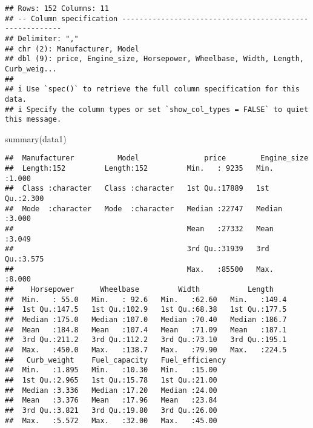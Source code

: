 \documentclass[
]{article}
\newenvironment{Shaded}{\begin{snugshade}}{\end{snugshade}}
\newcommand{\FunctionTok}[1]{\textcolor[rgb]{0.00,0.00,0.00}{#1}}
\newcommand{\NormalTok}[1]{#1}
\begin{document}
\begin{verbatim}
## Rows: 152 Columns: 11
## -- Column specification --------------------------------------------------------
## Delimiter: ","
## chr (2): Manufacturer, Model
## dbl (9): price, Engine_size, Horsepower, Wheelbase, Width, Length, Curb_weig...
## 
## i Use `spec()` to retrieve the full column specification for this data.
## i Specify the column types or set `show_col_types = FALSE` to quiet this message.
\end{verbatim}

\begin{Shaded}
\begin{Highlighting}[]
\FunctionTok{summary}\NormalTok{(data1)}
\end{Highlighting}
\end{Shaded}

\begin{verbatim}
##  Manufacturer          Model               price        Engine_size   
##  Length:152         Length:152         Min.   : 9235   Min.   :1.000  
##  Class :character   Class :character   1st Qu.:17889   1st Qu.:2.300  
##  Mode  :character   Mode  :character   Median :22747   Median :3.000  
##                                        Mean   :27332   Mean   :3.049  
##                                        3rd Qu.:31939   3rd Qu.:3.575  
##                                        Max.   :85500   Max.   :8.000  
##    Horsepower      Wheelbase         Width           Length     
##  Min.   : 55.0   Min.   : 92.6   Min.   :62.60   Min.   :149.4  
##  1st Qu.:147.5   1st Qu.:102.9   1st Qu.:68.38   1st Qu.:177.5  
##  Median :175.0   Median :107.0   Median :70.40   Median :186.7  
##  Mean   :184.8   Mean   :107.4   Mean   :71.09   Mean   :187.1  
##  3rd Qu.:211.2   3rd Qu.:112.2   3rd Qu.:73.10   3rd Qu.:195.1  
##  Max.   :450.0   Max.   :138.7   Max.   :79.90   Max.   :224.5  
##   Curb_weight    Fuel_capacity   Fuel_efficiency
##  Min.   :1.895   Min.   :10.30   Min.   :15.00  
##  1st Qu.:2.965   1st Qu.:15.78   1st Qu.:21.00  
##  Median :3.336   Median :17.20   Median :24.00  
##  Mean   :3.376   Mean   :17.96   Mean   :23.84  
##  3rd Qu.:3.821   3rd Qu.:19.80   3rd Qu.:26.00  
##  Max.   :5.572   Max.   :32.00   Max.   :45.00
\end{verbatim}
\end{document}
